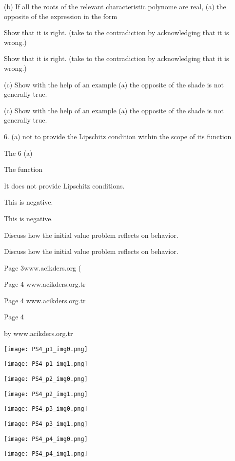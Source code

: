 \documentclass[12pt]{article}
\begin{document}
(b) If all the roots of the relevant characteristic polynome are real, (a) the opposite of the expression in the form

Show that it is right. (take to the contradiction by acknowledging that it is wrong.)

Show that it is right. (take to the contradiction by acknowledging that it is wrong.)

(c) Show with the help of an example (a) the opposite of the shade is not generally true.

(c) Show with the help of an example (a) the opposite of the shade is not generally true.

6. (a) not to provide the Lipschitz condition within the scope of its function

The 6 (a)

The function

It does not provide Lipschitz conditions.

This is negative.

This is negative.

Discuss how the initial value problem reflects on behavior.

Discuss how the initial value problem reflects on behavior.

Page 3www.acikders.org (

Page 4 www.acikders.org.tr

Page 4 www.acikders.org.tr

Page 4

by www.acikders.org.tr

\clearpage
\texttt{[image: PS4\_p1\_img0.png]}

\texttt{[image: PS4\_p1\_img1.png]}

\clearpage
\texttt{[image: PS4\_p2\_img0.png]}

\texttt{[image: PS4\_p2\_img1.png]}

\clearpage
\texttt{[image: PS4\_p3\_img0.png]}

\texttt{[image: PS4\_p3\_img1.png]}

\clearpage
\texttt{[image: PS4\_p4\_img0.png]}

\texttt{[image: PS4\_p4\_img1.png]}
\end{document}
